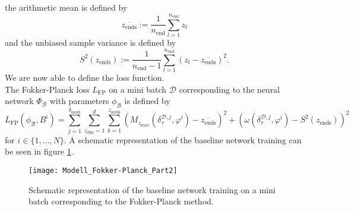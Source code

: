 \documentclass[11pt,titlepage]{article}
\theoremstyle{definition}
\theoremstyle{remark}
\begin{document}
	the arithmetic mean is defined by
	\[\overline{z_\mathrm{ends}}:= \frac{1}{n_\mathrm{end}}\sum_{l=1}^{n_\mathrm{end}}z_l\]
	and the unbiased sample variance is defined by
	\[S^2(z_\mathrm{ends}):= \frac{1}{n_\mathrm{end}-1}\sum_{l=1}^{n_\mathrm{end}}(z_l - \overline{z_\mathrm{ends}})^2.\]
	We are now able to define the loss function. \\
	The Fokker-Planck loss $L_\mathrm{FP}$ on a mini batch $\mathcal{D}$ corresponding to the neural network $\Phi_\mathcal{B}$ with parameters $\phi_\mathcal{B}$ is defined by
	\[L_\mathrm{FP}(\phi_\mathcal{B}, B^i)=\sum_{j=1}^{\delta_\mathrm{mesh}}\sum_{z_\mathrm{dim} = 1}^d \sum_{k=1}^{z_\mathrm{mesh}} \left(M_{z_\mathrm{start}}(\delta_\tau^{\mathcal{D},j}, \varphi^i)-\overline{z_\mathrm{ends}}\right)^2 + \left(\omega(\delta_\tau^{\mathcal{D},j}, \varphi^i)- S^2(z_\mathrm{ends})\right)^2\]
	for $i\in \{1,\ldots, N\}$. A schematic representation of the baseline network training can be seen in figure \ref{Abb model FP part 2}.
	
	\begin{figure}[h!]
		\centering
		\texttt{[image: Modell\_Fokker-Planck\_Part2]}
		\caption{Schematic representation of the baseline network training on a mini batch corresponding to the Fokker-Planck method.}
		\label{Abb model FP part 2}
	\end{figure}
	
\end{document}
